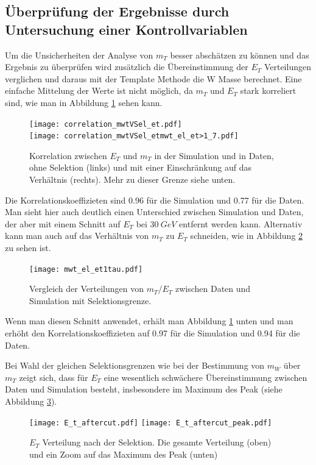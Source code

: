 \documentclass[a4paper,12pt]{article}
\begin{document}
\FloatBarrier
\subsection{Überprüfung der Ergebnisse durch Untersuchung einer Kontrollvariablen}
Um die Unsicherheiten der Analyse von $m_{T}$ besser abschätzen zu können und das Ergebnis zu überprüfen wird zusätzlich
die Übereinstimmung der $E_T$ Verteilungen verglichen und daraus mit der Template Methode die W Masse
berechnet. Eine einfache Mittelung der Werte ist nicht möglich, da $m_T$ und $E_T$ stark korreliert
sind, wie man in Abbildung \ref{fig:correlation} sehen kann.
\begin{figure}[htb]
	\centering
	\texttt{[image: correlation\_mwtVSel\_et.pdf]}\\
	\texttt{[image: correlation\_mwtVSel\_etmwt\_el\_et>1\_7.pdf]}
	\caption{Korrelation zwischen $E_T$ und $m_T$ in der Simulation und in Daten, ohne Selektion
	(links) und mit einer Einschränkung auf das Verhältnis (rechts). Mehr zu dieser Grenze siehe
	unten.}
	\label{fig:correlation}
\end{figure}

Die Korrelationskoeffizieten sind 0.96 für die Simulation und 0.77 für die Daten. Man sieht hier
auch deutlich einen Unterschied  zwischen Simulation und Daten, der aber mit einem Schnitt auf $E_T$ bei
$\SI{30}{GeV}$ entfernt werden kann. Alternativ kann man auch auf das Verhältnis von $m_T$ zu $E_T$
schneiden, wie in Abbildung \ref{fig:verhaeltnis} zu sehen ist.

\begin{figure}[htb]
	\centering
	\texttt{[image: mwt\_el\_et1tau.pdf]}
	\caption{Vergleich der Verteilungen von $m_T/E_T$ zwischen Daten und Simulation mit
	Selektionsgrenze.}
	\label{fig:verhaeltnis}
\end{figure}

Wenn man diesen Schnitt anwendet, erhält man Abbildung \ref{fig:correlation} unten und man
erhöht den Korrelationskoeffizieten auf 0.97 für die Simulation und 0.94 für die Daten.

Bei Wahl der gleichen Selektionsgrenzen wie bei der Bestimmung von $m_{W}$ über $m_T$ zeigt sich, dass 
für $E_{T}$ eine wesentlich schwächere Übereinstimmung zwischen Daten und Simulation besteht, insbesondere
im Maximum des Peak (siehe Abbildung \ref{fig:etaftercut}).
\begin{figure}[htb]
	\centering
	\texttt{[image: E\_t\_aftercut.pdf]}
	\texttt{[image: E\_t\_aftercut\_peak.pdf]}
	\caption{$E_{T}$ Verteilung nach der Selektion. Die gesamte Verteilung (oben) und ein Zoom auf das Maximum des Peak (unten) }
	\label{fig:etaftercut}
\end{figure}
\end{document}

